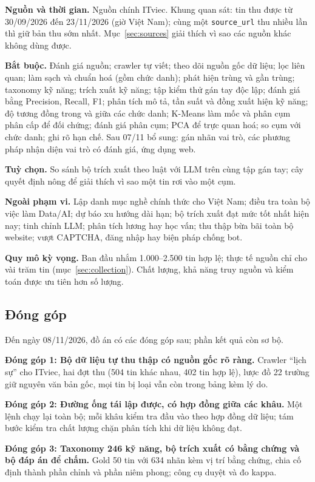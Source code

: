\documentclass[12pt]{article}
\newcommand{\code}[1]{\texttt{#1}}
\begin{document}
\textbf{Nguồn và thời gian.} Nguồn chính ITviec. Khung quan sát: tin thu được từ 30/09/2026 đến 23/11/2026 (giờ Việt Nam); cùng một \code{source\_url} thu nhiều lần thì giữ bản thu sớm nhất. Mục~\ref{sec:sources} giải thích vì sao các nguồn khác không dùng được.

\textbf{Bắt buộc.} Đánh giá nguồn; crawler tự viết; theo dõi nguồn gốc dữ liệu; lọc liên quan; làm sạch và chuẩn hoá (gồm chức danh); phát hiện trùng và gần trùng; taxonomy kỹ năng; trích xuất kỹ năng; tập kiểm thử gán tay độc lập; đánh giá bằng Precision, Recall, F1; phân tích mô tả, tần suất và đồng xuất hiện kỹ năng; độ tương đồng trong và giữa các chức danh; K-Means làm mốc và phân cụm phân cấp để đối chứng; đánh giá phân cụm; PCA để trực quan hoá; so cụm với chức danh; ghi rõ hạn chế. Sau 07/11 bổ sung: gán nhãn vai trò, các phương pháp nhận diện vai trò có đánh giá, ứng dụng web.

\textbf{Tuỳ chọn.} So sánh bộ trích xuất theo luật với LLM trên cùng tập gán tay; cây quyết định nông để giải thích vì sao một tin rơi vào một cụm.

\textbf{Ngoài phạm vi.} Lập danh mục nghề chính thức cho Việt Nam; điều tra toàn bộ việc làm Data/AI; dự báo xu hướng dài hạn; bộ trích xuất đạt mức tốt nhất hiện nay; tinh chỉnh LLM; phân tích lương hay học vấn; thu thập bừa bãi toàn bộ website; vượt CAPTCHA, đăng nhập hay biện pháp chống bot.

\textbf{Quy mô kỳ vọng.} Ban đầu nhắm 1.000--2.500 tin hợp lệ; thực tế nguồn chỉ cho vài trăm tin (mục~\ref{sec:collection}). Chất lượng, khả năng truy nguồn và kiểm toán được ưu tiên hơn số lượng.

\subsection{Đóng góp}

Đến ngày 08/11/2026, đồ án có các đóng góp sau; phần kết quả còn sơ bộ.

\textbf{Đóng góp 1: Bộ dữ liệu tự thu thập có nguồn gốc rõ ràng.} Crawler ``lịch sự'' cho ITviec, hai đợt thu (504 tin khác nhau, 402 tin hợp lệ), lược đồ 22 trường giữ nguyên văn bản gốc, mọi tin bị loại vẫn còn trong bảng kèm lý do.

\textbf{Đóng góp 2: Đường ống tái lập được, có hợp đồng giữa các khâu.} Một lệnh chạy lại toàn bộ; mỗi khâu kiểm tra đầu vào theo hợp đồng dữ liệu; tám bước kiểm tra chất lượng chặn phân tích khi dữ liệu không đạt.

\textbf{Đóng góp 3: Taxonomy 246 kỹ năng, bộ trích xuất có bằng chứng và bộ đáp án để chấm.} Gold 50 tin với 634 nhãn kèm vị trí bằng chứng, chia cố định thành phần chỉnh và phần niêm phong; công cụ duyệt và đo kappa.
\end{document}
